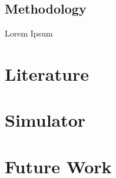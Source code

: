 \documentclass[a4paper,12pt]{article}
\begin{document}
\subsection{Methodology} \label{ss:meth}
Lorem Ipsum %



\pagebreak

\section{Literature} \label{s:lit}

\pagebreak

\section{Simulator} \label{s:sim}

\pagebreak

\section{Future Work} \label{s:concl}

\pagebreak



\end{document}
